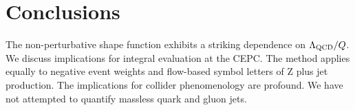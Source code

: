 \section{Conclusions}\label{sec:conclusions}

The non-perturbative shape function exhibits a striking dependence on
$\Lambda_{\rm QCD}/Q$. We discuss implications for integral evaluation
at the CEPC. The method applies equally to negative event weights and
flow-based symbol letters of Z plus jet production. The implications for
collider phenomenology are profound. We have not attempted to quantify
massless quark and gluon jets.

